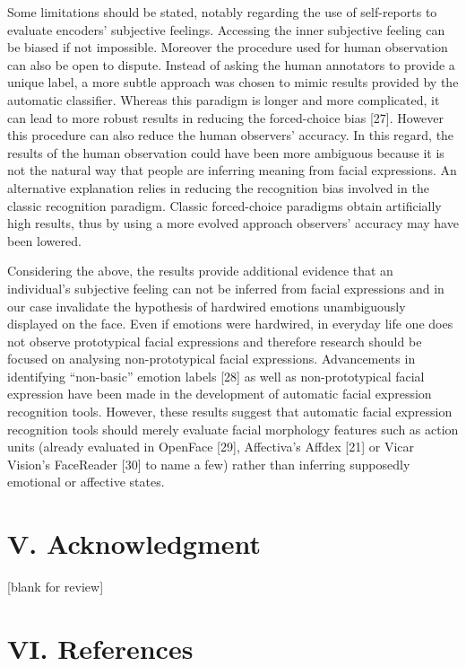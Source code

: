 \documentclass[conference,final,]{IEEEtran}
\begin{document}
Some limitations should be stated, notably regarding the use of
self-reports to evaluate encoders' subjective feelings. Accessing the
inner subjective feeling can be biased if not impossible. Moreover the
procedure used for human observation can also be open to dispute.
Instead of asking the human annotators to provide a unique label, a more
subtle approach was chosen to mimic results provided by the automatic
classifier. Whereas this paradigm is longer and more complicated, it can
lead to more robust results in reducing the forced-choice bias {[}27{]}.
However this procedure can also reduce the human observers' accuracy. In
this regard, the results of the human observation could have been more
ambiguous because it is not the natural way that people are inferring
meaning from facial expressions. An alternative explanation relies in
reducing the recognition bias involved in the classic recognition
paradigm. Classic forced-choice paradigms obtain artificially high
results, thus by using a more evolved approach observers' accuracy may
have been lowered.

Considering the above, the results provide additional evidence that an
individual's subjective feeling can not be inferred from facial
expressions and in our case invalidate the hypothesis of hardwired
emotions unambiguously displayed on the face. Even if emotions were
hardwired, in everyday life one does not observe prototypical facial
expressions and therefore research should be focused on analysing
non-prototypical facial expressions. Advancements in identifying
``non-basic'' emotion labels {[}28{]} as well as non-prototypical facial
expression have been made in the development of automatic facial
expression recognition tools. However, these results suggest that
automatic facial expression recognition tools should merely evaluate
facial morphology features such as action units (already evaluated in
OpenFace {[}29{]}, Affectiva's Affdex {[}21{]} or Vicar Vision's
FaceReader {[}30{]} to name a few) rather than inferring supposedly
emotional or affective states.

\hypertarget{acknowledgment}{%
\section{V. Acknowledgment}\label{acknowledgment}}

{[}blank for review{]}

\hypertarget{references}{%
\section{VI. References}\label{references}}
\end{document}
